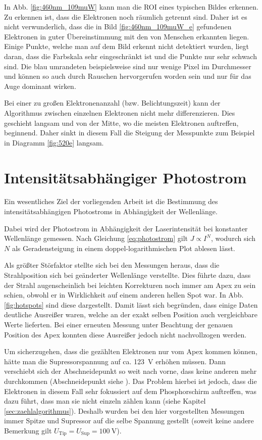 \documentclass[bachelor,       %
               twoside,        %
               BCOR10mm,       %
               english,ngerman, %
               ]{GAUBM}
\begin{document}
In Abb. \ref{fig:460nm_109muW} kann man die ROI eines typischen Bildes erkennen.
Zu erkennen ist, dass die Elektronen noch räumlich getrennt sind.
Daher ist es nicht verwunderlich, dass die in Bild \ref{fig:460nm_109muW_e} gefundenen Elektronen in guter Übereinstimmung mit den von Menschen erkannten liegen.
Einige Punkte, welche man auf dem Bild erkennt nicht detektiert wurden, liegt daran, dass die Farbskala sehr eingeschränkt ist und die Punkte nur sehr schwach sind.
Die blau umrandeten beispielsweise sind nur wenige Pixel im Durchmesser und können so auch durch Rauschen hervorgerufen worden sein und nur für das Auge dominant wirken.

Bei einer zu großen Elektronenanzahl (bzw. Belichtungszeit) kann der Algorithmus zwischen einzelnen Elektronen nicht mehr differenzieren.
Dies geschieht langsam und von der Mitte, wo die meisten Elektronen auftreffen, beginnend.
Daher sinkt in diesem Fall die Steigung der Messpunkte zum Beispiel in Diagramm \ref{fig:520e} langsam.





\section{Intensitätsabhängiger Photostrom}
Ein wesentliches Ziel der vorliegenden Arbeit ist die Bestimmung des intensitätsabhängigen Photostroms in Abhängigkeit der Wellenlänge.

Dabei wird der Photostrom in Abhängigkeit der Laserintensität bei konstanter Wellenlänge gemessen.
Nach Gleichung \ref{eq:photostrom} gilt $J\propto I^N$, wodurch sich $N$ als Geradensteigung in einem doppel-logarithmischen Plot ablesen lässt.

Als größter Störfaktor stellte sich bei den Messungen heraus, dass die Strahlposition sich bei geänderter Wellenlänge verstellte.
Dies führte dazu, dass der Strahl augenscheinlich bei leichten Korrekturen noch immer am Apex zu sein schien, obwohl er in Wirklichkeit auf einem anderen hellen Spot war.
In Abb. \ref{fig:hotspots} sind diese dargestellt.
Damit lässt sich begründen, dass einige Daten deutliche Ausreißer waren, welche an der exakt selben Position auch vergleichbare Werte lieferten.
Bei einer erneuten Messung unter Beachtung der genauen Position des Apex konnten diese Ausreißer jedoch nicht nachvollzogen werden.

Um sicherzugehen, dass die gezählten Elektronen nur vom Apex kommen können, hätte man die Supressorspannung auf ca. \SI{123}{\V} erhöhen müssen.
Dann verschiebt sich der Abschneidepunkt so weit nach vorne, dass keine anderen mehr durchkommen (Abschneidepunkt siehe \cite[S. 71 ff.]{bormann_2015}).
Das Problem hierbei ist jedoch, dass die Elektronen in diesem Fall sehr fokussiert auf dem Phosphorschirm auftreffen, was dazu führt, dass man sie nicht einzeln zählen kann (siehe Kapitel \ref{sec:zaehlalgorithmus}).
Deshalb wurden bei den hier vorgestellten Messungen immer Spitze und Supressor auf die selbe Spannung gestellt (soweit keine andere Bemerkung gilt $U_\text{Tip}=U_\text{Sup}=\SI{100}{\V}$).
\end{document}
